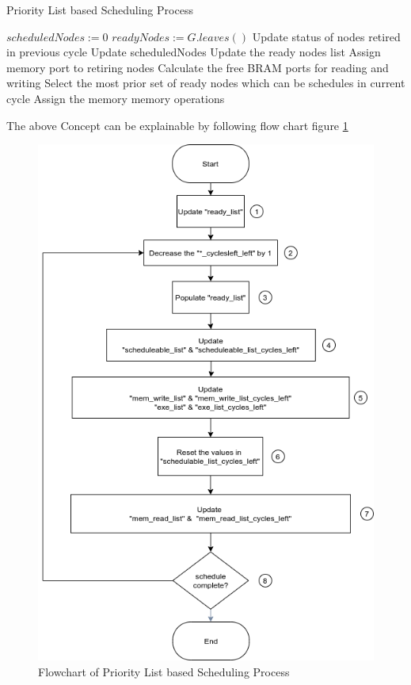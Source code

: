 \begin{algorithm}[H]
    \caption{Priority List based Scheduling Process}
        \label{algo:sch:sch}
    \begin{algorithmic}[1]
        \Statex
        \State $scheduledNodes := 0$
        \State $readyNodes := G.leaves()$
            \State Update status of nodes retired in previous cycle
            \State Update scheduledNodes
            \State Update the ready nodes list
            \State Assign memory port to retiring nodes
            \State Calculate the free BRAM ports for reading and writing
            \State Select the most prior set of ready nodes which can be schedules in current cycle
            \State Assign the memory memory operations
        \EndWhile
    \end{algorithmic}
\end{algorithm}
The above Concept can be explainable by following flow chart figure \ref{fig:sch:Flowchart}
\begin{figure}[H]
    \centering
    \includegraphics[width = 0.5 \textwidth]{./Scheduler/Flowchart.png}
    \caption{Flowchart of Priority List based Scheduling Process \cite{AnuragWork}}
    \label{fig:sch:Flowchart}
\end{figure}

